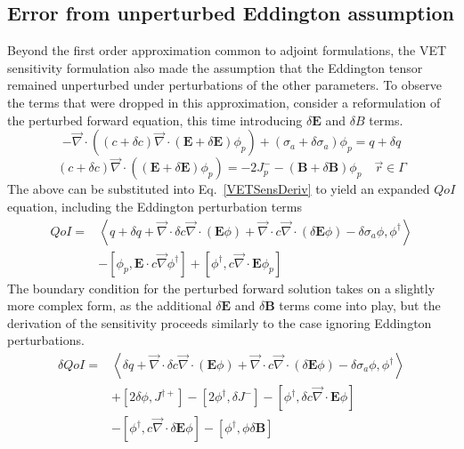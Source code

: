 \documentclass{article}
\newcommand{\vr}{\vec{r}}
\newcommand{\bra}{\left\langle}
\newcommand{\ket}{\right\rangle}
\newcommand{\sbra}{\left[}
\newcommand{\sket}{\right]}
\newcommand{\vdiv}{\vec{\nabla} \cdot}
\newcommand{\vgrad}{\vec{\nabla}}
\newcommand{\Edd}{\mathbf{E}}
\newcommand{\BEdd}{\mathbf{B}}
\newcommand{\siga}{\sigma_a}
\newcommand{\isigt}{c}
\newcommand{\scalSource}{q}
\newcommand{\qoi}{QoI}
\begin{document}
\subsection{Error from unperturbed Eddington assumption}
Beyond the first order approximation common to adjoint formulations, the VET sensitivity formulation also made the assumption that the Eddington tensor remained unperturbed under perturbations of the other parameters. To observe the terms that were dropped in this approximation, consider a reformulation of the perturbed forward equation, this time introducing $\delta \Edd$ and $\delta  B$ terms. 
\begin{equation}
\label{VEFPerEdd}
- \vdiv \left((\isigt + \delta \isigt)\vdiv (\Edd + \delta \Edd) \phi_p \right) + (\siga + \delta \siga)\phi_p = \scalSource + \delta \scalSource
\end{equation}
\begin{equation}
(\isigt + \delta \isigt) \vec{\nabla} \cdot \left((\Edd + \delta \Edd) \phi_p \right)  = - 2J_p^- - (\BEdd +\delta \BEdd) \phi_p \quad \vr \in \Gamma
\end{equation}
The above can be substituted into Eq.~\eqref{VETSensDeriv} to yield an expanded $\qoi$ equation, including the Eddington perturbation terms
\begin{equation}
\label{QoIVETAdjNoBCEdd}
\begin{split}
\qoi =& \bra \scalSource + \delta \scalSource + \vdiv \delta \isigt \vdiv \left( \Edd \phi \right) + \vdiv \isigt \vdiv \left( \delta \Edd \phi \right) - \delta \siga \phi, \phi^\dag \ket \\
&- \sbra \phi_p, \Edd \cdot \isigt \vgrad \phi^\dag \sket 
+ \sbra \phi^\dag , \isigt \vdiv \Edd \phi_p \sket
\end{split}
\end{equation}
The boundary condition for the perturbed forward solution takes on a slightly more complex form, as the additional $\delta \Edd$ and $\delta \BEdd$ terms come into play, but the derivation of the sensitivity proceeds similarly to the case ignoring Eddington perturbations.
\begin{equation}
\label{QoIVETAdjEdd}
\begin{split}
\delta \qoi =& \bra \delta \scalSource + \vdiv \delta \isigt \vdiv \left( \Edd \phi \right) + \vdiv \isigt \vdiv \left( \delta \Edd \phi \right) - \delta \siga \phi, \phi^\dag \ket \\
&+ \sbra 2\delta \phi, J^{\dag +} \sket  - \sbra 2\phi^\dag, \delta J^- \sket
- \sbra \phi^\dag, \delta \isigt \vdiv \Edd \phi \sket
\\
&- \sbra  \phi^\dag ,\isigt \vdiv \delta \Edd \phi \sket
- \sbra \phi^\dag, \phi \delta \BEdd \sket
\end{split}
\end{equation} 
\end{document}
